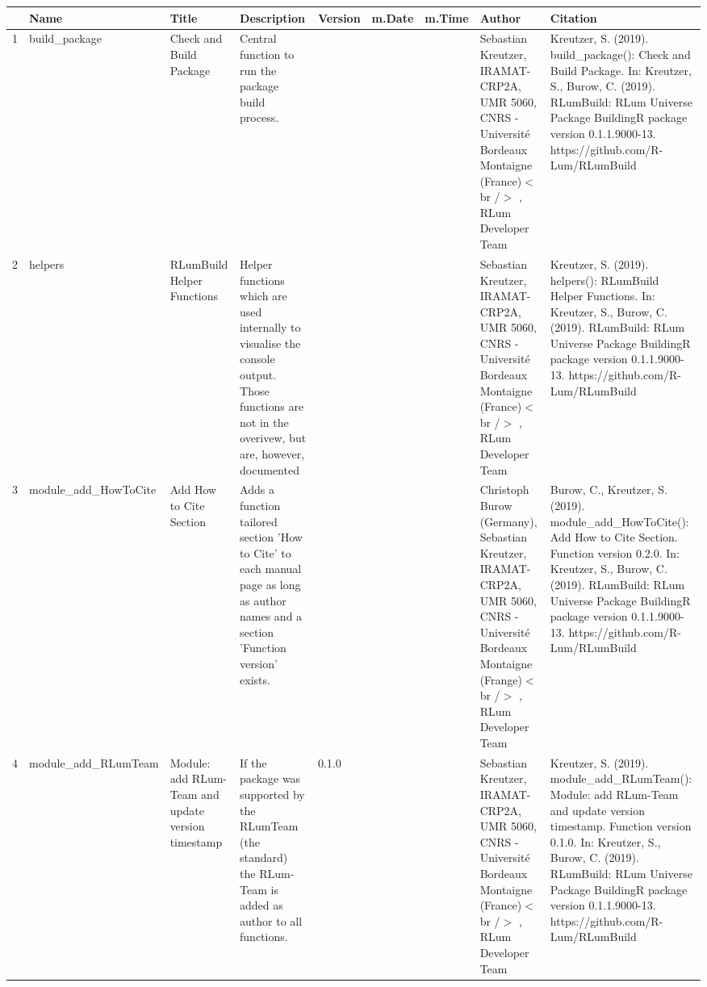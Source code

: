 \begin{table}[ht]
\centering
\begin{tabular}{rllllllll}
  \hline
 & Name & Title & Description & Version & m.Date & m.Time & Author & Citation \\ 
  \hline
1 & build\_package & Check and Build Package & Central function to run the package build process. &  &  &  & Sebastian Kreutzer, IRAMAT-CRP2A, UMR 5060, CNRS - Université Bordeaux Montaigne (France)$<$br /$>$ , RLum Developer Team & Kreutzer, S. (2019). build\_package(): Check and Build Package. In: Kreutzer, S., Burow, C. (2019). RLumBuild: RLum Universe Package BuildingR package version 0.1.1.9000-13. https://github.com/R-Lum/RLumBuild
 \\ 
  2 & helpers & RLumBuild Helper Functions & Helper functions which are used internally to visualise the console output. Those functions are not in the overivew, but are, however, documented &  &  &  & Sebastian Kreutzer, IRAMAT-CRP2A, UMR 5060, CNRS - Université Bordeaux Montaigne (France)$<$br /$>$ , RLum Developer Team & Kreutzer, S. (2019). helpers(): RLumBuild Helper Functions. In: Kreutzer, S., Burow, C. (2019). RLumBuild: RLum Universe Package BuildingR package version 0.1.1.9000-13. https://github.com/R-Lum/RLumBuild
 \\ 
  3 & module\_add\_HowToCite & Add How to Cite Section & Adds a function tailored section 'How to Cite' to each manual page as long as author names and a section 'Function version' exists. &  &  &  & Christoph Burow (Germany), Sebastian Kreutzer, IRAMAT-CRP2A, UMR 5060, CNRS - Université Bordeaux Montaigne (Frange)$<$br /$>$ , RLum Developer Team & Burow, C., Kreutzer, S. (2019). module\_add\_HowToCite(): Add How to Cite Section. Function version 0.2.0. In: Kreutzer, S., Burow, C. (2019). RLumBuild: RLum Universe Package BuildingR package version 0.1.1.9000-13. https://github.com/R-Lum/RLumBuild
 \\ 
  4 & module\_add\_RLumTeam & Module: add RLum-Team and update version timestamp & If the package was supported by the RLumTeam (the standard) the RLum-Team is added as author to all functions. & 0.1.0
 &  &  & Sebastian Kreutzer, IRAMAT-CRP2A, UMR 5060, CNRS - Université Bordeaux Montaigne (France)$<$br /$>$ , RLum Developer Team & Kreutzer, S. (2019). module\_add\_RLumTeam(): Module: add RLum-Team and update version timestamp. Function version 0.1.0. In: Kreutzer, S., Burow, C. (2019). RLumBuild: RLum Universe Package BuildingR package version 0.1.1.9000-13. https://github.com/R-Lum/RLumBuild
 \\ 

\end{tabular}
\end{table}
